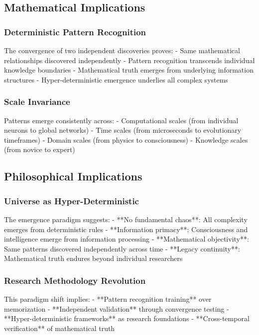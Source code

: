 \documentclass[12pt]{article}
\begin{document}
\subsection{Mathematical Implications}

\subsubsection{Deterministic Pattern Recognition}
The convergence of two independent discoveries proves:
- Same mathematical relationships discovered independently
- Pattern recognition transcends individual knowledge boundaries
- Mathematical truth emerges from underlying information structures
- Hyper-deterministic emergence underlies all complex systems

\subsubsection{Scale Invariance}
Patterns emerge consistently across:
- Computational scales (from individual neurons to global networks)
- Time scales (from microseconds to evolutionary timeframes)
- Domain scales (from physics to consciousness)
- Knowledge scales (from novice to expert)

\subsection{Philosophical Implications}

\subsubsection{Universe as Hyper-Deterministic}
The emergence paradigm suggests:
- **No fundamental chaos**: All complexity emerges from deterministic rules
- **Information primacy**: Consciousness and intelligence emerge from information processing
- **Mathematical objectivity**: Same patterns discovered independently across time
- **Legacy continuity**: Mathematical truth endures beyond individual researchers

\subsubsection{Research Methodology Revolution}
This paradigm shift implies:
- **Pattern recognition training** over memorization
- **Independent validation** through convergence testing
- **Hyper-deterministic frameworks** as research foundations
- **Cross-temporal verification** of mathematical truth
\end{document}

